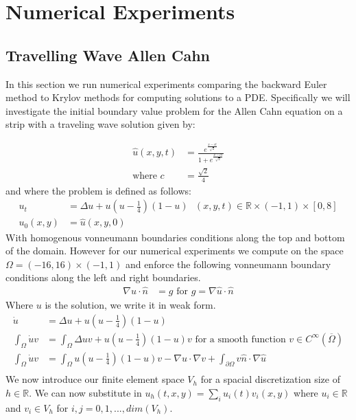 \section{Numerical Experiments}

\subsection{Travelling Wave Allen Cahn}
In this section we run numerical experiments comparing the backward Euler method to Krylov methods for computing solutions to a PDE.
Specifically we will investigate the initial boundary value problem for the Allen Cahn equation on a strip with a traveling wave solution\cite{YukitakaFukao2004} given by:

\begin{align*}
    \hat u(x,y,t)&=\frac{e^{\frac{x-ct}{\sqrt2}}}{1+e^{\frac{x-ct}{\sqrt2}}} \label{TravelingWaveSol}\\
    \text{where } c &= \frac{\sqrt{2}}{4}
\end{align*}
and where the problem is defined as follows:
\begin{align*}
    u_t&=\Delta u+u(u-\frac14)(1-u) \text{ $(x,y,t)\in \mathbb{R} \times (-1,1) \times [0, 8]$}\\
    u_0(x, y) &= \hat u(x,y, 0)
\end{align*}
With homogenous vonneumann boundaries conditions along the top and bottom of the domain. 
However for our numerical experiments we compute on the space $\Omega=(-16,16)\times(-1,1)$ and enforce the following vonneumann boundary conditions along the left and right boundaries.
\begin{align*}
    \nabla u \cdot \hat n &= g \text{ for $g = \nabla \hat u \cdot \hat n$}
\end{align*}
Where $u$ is the solution, we write it in weak form.
\begin{align*}
    \dot u&=\Delta u+u(u-\frac14)(1-u)\\
    \int_{\Omega} \dot u v &=\int_{\Omega} \Delta uv+u(u-\frac14)(1-u)v \text{ for a smooth function $v \in C^{\infty}(\overline{\Omega})$}\\
    \int_{\Omega} \dot u v &=\int_{\Omega} u(u-\frac14)(1-u)v - \nabla u \cdot \nabla v + \int_{\partial\Omega}  v\hat n \cdot \nabla \hat u\\
\end{align*}
We now introduce our finite element space $V_h$ for a spacial discretization size of $h \in \mathbb{R}$.
We can now substitute in $u_h(t,x,y) = \sum_i u_i(t) v_i(x,y)$ where $u_i \in \mathbb{R}$ and $v_i \in V_h$ for $i,j = 0,1,...,dim(V_h)$.
